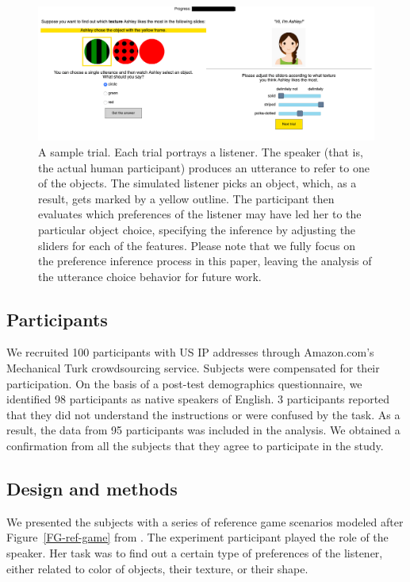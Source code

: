 \documentclass[10pt,a4paper]{article}
\begin{document}
\begin{figure}[ht!]
	\centering
	\includegraphics[width=5.5in]{images/trial.png}
	\caption{ \small{A sample trial. Each trial portrays a listener. The speaker (that is, the actual human participant) produces an utterance to refer to one of the objects. The simulated listener picks an object, which, as a result, gets marked by a yellow outline. The participant then evaluates which preferences of the listener may have led her to the particular object choice, specifying the inference by adjusting the sliders for each of the features. Please note that we fully focus on the preference inference process in this paper, leaving the analysis of the utterance choice behavior for future work.} }
	\label{exp1-trial}
\end{figure}



\subsection{Participants}

We recruited 100 participants with US IP addresses through Amazon.com's Mechanical Turk crowdsourcing service. Subjects were compensated for their participation. On the basis of a post-test demographics questionnaire, we identified 98 participants as native speakers of English. 3 participants reported that they did not understand the instructions or were confused by the task. As a result, the data from 95 participants was included in the analysis. We obtained a confirmation from all the subjects that they agree to participate in the study.


\subsection{Design and methods}

We presented the subjects with a series of reference game scenarios modeled after Figure~\ref{FG-ref-game} from . The experiment participant played the role of the speaker. Her task was to find out a certain type of preferences of the listener, either related to color of objects, their texture, or their shape. 
\end{document}
